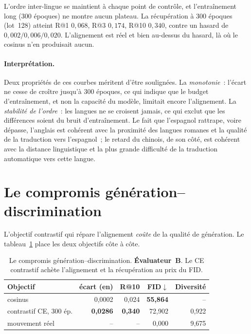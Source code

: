 \documentclass[12pt,a4paper,oneside]{report}
\theoremstyle{definition}
\theoremstyle{plain}
\begin{document}
L'ordre inter-lingue se maintient à chaque point de contrôle, et l'entraînement
long (300 époques) ne montre aucun plateau. La récupération à 300 époques (lot~128)
atteint R@1 $0{,}068$, R@3 $0{,}174$, R@10 $0{,}340$, contre un hasard de
$0{,}002/0{,}006/0{,}020$. L'alignement est réel et bien au-dessus du hasard, là
où le cosinus n'en produisait aucun.

\paragraph{Interprétation.} Deux propriétés de ces courbes méritent d'être
soulignées. La \emph{monotonie}~: l'écart ne cesse de croître jusqu'à 300 époques,
ce qui indique que le budget d'entraînement, et non la capacité du modèle, limitait
encore l'alignement. La \emph{stabilité de l'ordre}~: les langues ne se croisent
jamais, ce qui exclut que les différences soient du bruit d'entraînement. Le fait que
l'espagnol rattrape, voire dépasse, l'anglais est cohérent avec la proximité des
langues romanes et la qualité de la traduction vers l'espagnol~; le retard du
chinois, de son côté, est cohérent avec la distance linguistique et la plus grande
difficulté de la traduction automatique vers cette langue.

\section{Le compromis génération--discrimination}
\label{sec:tradeoff}

L'objectif contrastif qui répare l'alignement \emph{coûte} de la qualité de
génération. Le tableau~\ref{tab:tradeoff} place les deux objectifs côte à côte.

\begin{table}[ht]
\centering
\caption{Le compromis génération--discrimination. \textbf{Évaluateur~B}. Le CE
contrastif achète l'alignement et la récupération au prix du FID.}
\label{tab:tradeoff}
\small
\begin{tabular}{@{}lrrrr@{}}
\toprule
Objectif & écart (en) & R@10 & FID$\downarrow$ & Diversité \\
\midrule
cosinus                & 0,0002 & 0,024 & \textbf{55,864} & -- \\
contrastif CE, 300 ép. & \textbf{0,0286} & \textbf{0,340} & 72,902 & 0,922 \\
mouvement réel         & -- & -- & 0,000 & 9,675 \\
\bottomrule
\end{tabular}
\end{table}
\end{document}
